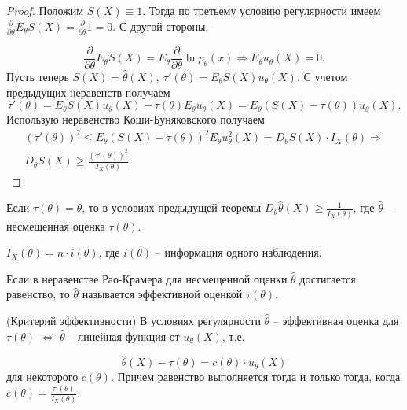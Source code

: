 \begin{proof}
Положим $\displaystyle S( X) \equiv 1$. Тогда по третьему условию регулярности имеем $\displaystyle \frac{\partial }{\partial \theta } E_{\theta } S( X) =\frac{\partial }{\partial \theta } 1=0$. С другой стороны,


\begin{equation*}
\frac{\partial }{\partial \theta } E_{\theta } S( X) =E_{\theta }\frac{\partial }{\partial \theta }\ln p_{\theta }( x) \Rightarrow E_{\theta } u_{\theta }( X) =0.
\end{equation*}
Пусть теперь $\displaystyle S( X) =\hat{\theta }( X),\ \tau '( \theta ) =E_{\theta } S( X) u_{\theta }( X)$. С учетом предыдущих неравенств получаем
\begin{equation*}
\tau '( \theta ) =E_{\theta } S( X) u_{\theta }( X) -\tau ( \theta ) E_{\theta } u_{\theta }( X) =E_{\theta }( S( X) -\tau ( \theta )) u_{\theta }( X) .
\end{equation*}
Использую неравенство Коши-Буняковского получаем
\begin{gather*}
( \tau '( \theta ))^{2} \leqslant E_{\theta }( S( X) -\tau ( \theta ))^{2} E_{\theta } u_{\theta }^{2}( X) =D_{\theta } S( X) \cdotp I_{X}( \theta ) \Rightarrow \\
D_{\theta } S( X) \geqslant \frac{( \tau '( \theta ))^{2}}{I_{X}( \theta )} .
\end{gather*}
\end{proof}
\begin{corollary}
Если $\displaystyle \tau ( \theta ) =\theta $, то в условиях предыдущей теоремы $\displaystyle D_{\theta }\hat{\theta }( X) \ge\frac{1}{I_{X}( \theta )}$, где $\displaystyle \hat{\theta }$ -- несмещенная оценка $\displaystyle \tau ( \theta )$.
\end{corollary}
\begin{exercise}
$\displaystyle I_{X}( \theta ) =n\cdotp i( \theta )$, где $\displaystyle i( \theta )$ -- информация одного наблюдения.
\end{exercise}
\begin{definition}
Если в неравенстве Рао-Крамера для несмещенной оценки $\displaystyle \hat{\theta }$ достигается равенство, то $\displaystyle \hat{\theta }$ называется эффективной оценкой $\displaystyle \tau ( \theta )$.
\end{definition}
\begin{theorem}
(Критерий эффективности) В условиях регулярности $\displaystyle \hat{\theta }$ -- эффективная оценка для $\displaystyle \tau ( \theta )$ $\displaystyle \Leftrightarrow $ $\displaystyle \hat{\theta }$ -- линейная функция от $\displaystyle u_{\theta }( X)$, т.е.


\begin{equation*}
\hat{\theta }( X) -\tau ( \theta ) =c( \theta ) \cdotp u_{\theta }( X)
\end{equation*}
для некоторого $\displaystyle c( \theta )$. Причем равенство выполняется тогда и только тогда, когда $\displaystyle c( \theta ) =\frac{\tau '( \theta )}{I_{X}( \theta )}$.
\end{theorem}
